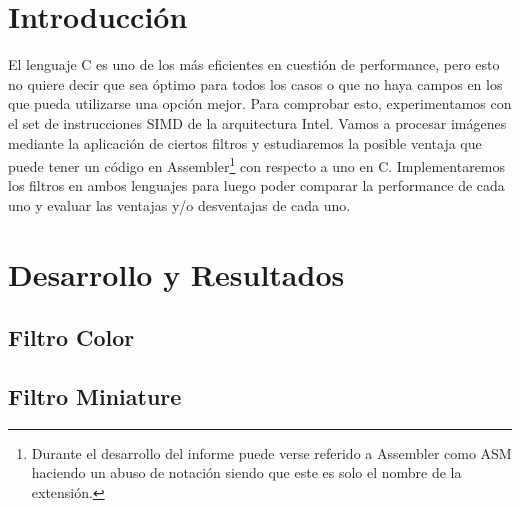 \documentclass[a4paper,10pt,twoside]{article}
\begin{document}
\newpage




\tableofcontents

\newpage




\section{Introducción}

El lenguaje C es uno de los más eficientes en cuestión de performance, pero esto no quiere decir que sea óptimo para todos los casos o que no haya campos en los que pueda utilizarse una opción mejor.
Para comprobar esto, experimentamos con el set de instrucciones SIMD de la arquitectura Intel. Vamos a procesar imágenes mediante la aplicación de ciertos filtros y estudiaremos la posible ventaja que puede tener un código en Assembler\footnote{Durante el desarrollo del informe puede verse referido a Assembler como ASM haciendo un abuso de notaci\'on siendo que este es solo el nombre de la extensi\'on.} con respecto a uno en C.
Implementaremos los filtros en ambos lenguajes para luego poder comparar la performance de cada uno y evaluar las ventajas y/o desventajas de cada uno.




\newpage
\section{Desarrollo y Resultados}

\subsection{Filtro Color}


\newpage
\subsection{Filtro Miniature}
\end{document}
